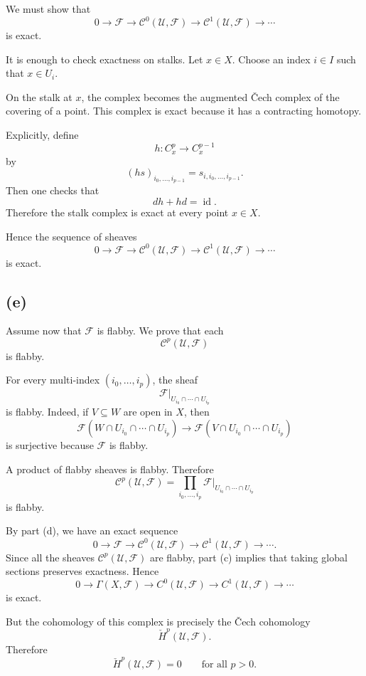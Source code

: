 \documentclass[12pt,a4paper]{article}
\theoremstyle{notespace}
\begin{document}
We must show that
\[
0\longrightarrow \mathcal F
\longrightarrow
\mathcal C^0(\mathcal U,\mathcal F)
\longrightarrow
\mathcal C^1(\mathcal U,\mathcal F)
\longrightarrow
\cdots
\]
is exact.

It is enough to check exactness on stalks. Let $x\in X$. Choose an index
$i\in I$ such that $x\in U_i$.

On the stalk at $x$, the complex becomes the augmented \v{C}ech complex
of the covering of a point. This complex is exact because it has a
contracting homotopy.

Explicitly, define
\[
h:C^p_x\longrightarrow C^{p-1}_x
\]
by
\[
(hs)_{i_0,\ldots,i_{p-1}}
=
s_{i,i_0,\ldots,i_{p-1}}.
\]
Then one checks that
\[
dh+hd=\operatorname{id}.
\]
Therefore the stalk complex is exact at every point $x\in X$.

Hence the sequence of sheaves
\[
0\longrightarrow \mathcal F
\longrightarrow
\mathcal C^0(\mathcal U,\mathcal F)
\longrightarrow
\mathcal C^1(\mathcal U,\mathcal F)
\longrightarrow
\cdots
\]
is exact.

\subsection*{(e)}

Assume now that $\mathcal F$ is flabby. We prove that each
\[
\mathcal C^p(\mathcal U,\mathcal F)
\]
is flabby.

For every multi-index $(i_0,\ldots,i_p)$, the sheaf
\[
\mathcal F|_{U_{i_0}\cap\cdots\cap U_{i_p}}
\]
is flabby. Indeed, if $V\subseteq W$ are open in $X$, then
\[
\mathcal F(W\cap U_{i_0}\cap\cdots\cap U_{i_p})
\longrightarrow
\mathcal F(V\cap U_{i_0}\cap\cdots\cap U_{i_p})
\]
is surjective because $\mathcal F$ is flabby.

A product of flabby sheaves is flabby. Therefore
\[
\mathcal C^p(\mathcal U,\mathcal F)
=
\prod_{i_0,\ldots,i_p}
\mathcal F|_{U_{i_0}\cap\cdots\cap U_{i_p}}
\]
is flabby.

By part (d), we have an exact sequence
\[
0\longrightarrow \mathcal F
\longrightarrow
\mathcal C^0(\mathcal U,\mathcal F)
\longrightarrow
\mathcal C^1(\mathcal U,\mathcal F)
\longrightarrow
\cdots.
\]
Since all the sheaves $\mathcal C^p(\mathcal U,\mathcal F)$ are flabby,
part (c) implies that taking global sections preserves exactness. Hence
\[
0\longrightarrow \Gamma(X,\mathcal F)
\longrightarrow C^0(\mathcal U,\mathcal F)
\longrightarrow C^1(\mathcal U,\mathcal F)
\longrightarrow \cdots
\]
is exact.

But the cohomology of this complex is precisely the \v{C}ech cohomology
\[
\check H^p(\mathcal U,\mathcal F).
\]
Therefore
\[
\check H^p(\mathcal U,\mathcal F)=0
\qquad
\text{for all }p>0.
\]
\end{document}
